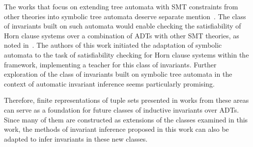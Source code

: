 The works that focus on extending tree automata with SMT constraints from other theories into symbolic tree automata deserve separate mention~\cite{VEANES2015418,10.1145/2933575.2933578}. The class of invariants built on such automata would enable checking the satisfiability of Horn clause systems over a combination of ADTs with other SMT theories, as noted in~\cite{10.1007/978-3-031-13188-2_13}. The authors of this work initiated the adaptation of symbolic automata to the task of satisfiability checking for Horn clause systems within the \ice{} framework, implementing a teacher for this class of invariants. Further exploration of the class of invariants built on symbolic tree automata in the context of automatic invariant inference seems particularly promising.

Therefore, finite representations of tuple sets presented in works from these areas can serve as a foundation for future classes of inductive invariants over ADTs. Since many of them are constructed as extensions of the classes examined in this work, the methods of invariant inference proposed in this work can also be adapted to infer invariants in these new classes.